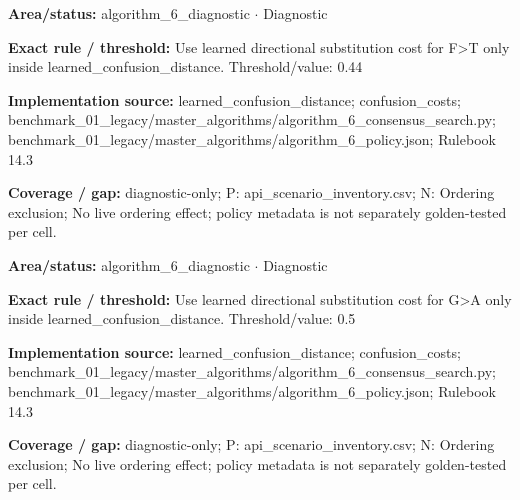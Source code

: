\begin{tcolorbox}[enhanced,breakable,colback=white,colframe=Muted!45,boxrule=0.45pt,arc=1.5pt,left=6pt,right=6pt,top=5pt,bottom=5pt,title={\texttt{A6-LEARNED-SUBSTITUTION-F-T}},title after break={\texttt{A6-LEARNED-SUBSTITUTION-F-T}\ (continued)},fonttitle=\headingfont\bfseries\color{Navy},coltitle=Navy]
\textbf{Area/status:} algorithm\_\allowbreak{}6\_\allowbreak{}diagnostic $\boldsymbol{\cdot}$ Diagnostic\par
\smallskip
\textbf{Exact rule / threshold:} Use learned directional substitution cost for F>T only inside learned\_\allowbreak{}confusion\_\allowbreak{}distance. Threshold/\allowbreak{}value: 0.44\par
\smallskip
\textbf{Implementation source:} learned\_\allowbreak{}confusion\_\allowbreak{}distance; confusion\_\allowbreak{}costs; benchmark\_\allowbreak{}01\_\allowbreak{}legacy/\allowbreak{}master\_\allowbreak{}algorithms/\allowbreak{}algorithm\_\allowbreak{}6\_\allowbreak{}consensus\_\allowbreak{}search.py; benchmark\_\allowbreak{}01\_\allowbreak{}legacy/\allowbreak{}master\_\allowbreak{}algorithms/\allowbreak{}algorithm\_\allowbreak{}6\_\allowbreak{}policy.json; Rulebook 14.3\par
\smallskip
\textbf{Coverage / gap:} diagnostic-only; P: api\_\allowbreak{}scenario\_\allowbreak{}inventory.csv; N: Ordering exclusion; No live ordering effect; policy metadata is not separately golden-tested per cell.
\end{tcolorbox}
\begin{tcolorbox}[enhanced,breakable,colback=white,colframe=Muted!45,boxrule=0.45pt,arc=1.5pt,left=6pt,right=6pt,top=5pt,bottom=5pt,title={\texttt{A6-LEARNED-SUBSTITUTION-G-A}},title after break={\texttt{A6-LEARNED-SUBSTITUTION-G-A}\ (continued)},fonttitle=\headingfont\bfseries\color{Navy},coltitle=Navy]
\textbf{Area/status:} algorithm\_\allowbreak{}6\_\allowbreak{}diagnostic $\boldsymbol{\cdot}$ Diagnostic\par
\smallskip
\textbf{Exact rule / threshold:} Use learned directional substitution cost for G>A only inside learned\_\allowbreak{}confusion\_\allowbreak{}distance. Threshold/\allowbreak{}value: 0.5\par
\smallskip
\textbf{Implementation source:} learned\_\allowbreak{}confusion\_\allowbreak{}distance; confusion\_\allowbreak{}costs; benchmark\_\allowbreak{}01\_\allowbreak{}legacy/\allowbreak{}master\_\allowbreak{}algorithms/\allowbreak{}algorithm\_\allowbreak{}6\_\allowbreak{}consensus\_\allowbreak{}search.py; benchmark\_\allowbreak{}01\_\allowbreak{}legacy/\allowbreak{}master\_\allowbreak{}algorithms/\allowbreak{}algorithm\_\allowbreak{}6\_\allowbreak{}policy.json; Rulebook 14.3\par
\smallskip
\textbf{Coverage / gap:} diagnostic-only; P: api\_\allowbreak{}scenario\_\allowbreak{}inventory.csv; N: Ordering exclusion; No live ordering effect; policy metadata is not separately golden-tested per cell.
\end{tcolorbox}

